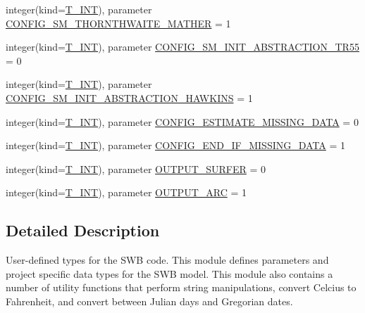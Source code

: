 \begin{DoxyCompactItemize}
\item 
integer(kind=\hyperlink{namespacetypes_a4e4d040a4425196c4d43be63e7e6103a}{T\_\-INT}), parameter \hyperlink{namespacetypes_ab0238e5ae5af01cbed3d4744b054f4b7}{CONFIG\_\-SM\_\-THORNTHWAITE\_\-MATHER} = 1
\item 
integer(kind=\hyperlink{namespacetypes_a4e4d040a4425196c4d43be63e7e6103a}{T\_\-INT}), parameter \hyperlink{namespacetypes_a479612698829962978355c82816e1875}{CONFIG\_\-SM\_\-INIT\_\-ABSTRACTION\_\-TR55} = 0
\item 
integer(kind=\hyperlink{namespacetypes_a4e4d040a4425196c4d43be63e7e6103a}{T\_\-INT}), parameter \hyperlink{namespacetypes_a580e1bc2da4e4c9c9881e31d2ee11478}{CONFIG\_\-SM\_\-INIT\_\-ABSTRACTION\_\-HAWKINS} = 1
\item 
integer(kind=\hyperlink{namespacetypes_a4e4d040a4425196c4d43be63e7e6103a}{T\_\-INT}), parameter \hyperlink{namespacetypes_a160cf0789c7288f51ba40cb7e19f46a3}{CONFIG\_\-ESTIMATE\_\-MISSING\_\-DATA} = 0
\item 
integer(kind=\hyperlink{namespacetypes_a4e4d040a4425196c4d43be63e7e6103a}{T\_\-INT}), parameter \hyperlink{namespacetypes_a9c39021370e43388bffb3def7c09570b}{CONFIG\_\-END\_\-IF\_\-MISSING\_\-DATA} = 1
\item 
integer(kind=\hyperlink{namespacetypes_a4e4d040a4425196c4d43be63e7e6103a}{T\_\-INT}), parameter \hyperlink{namespacetypes_a6a4c289d08a585bfc0dda1fa41bf2b4a}{OUTPUT\_\-SURFER} = 0
\item 
integer(kind=\hyperlink{namespacetypes_a4e4d040a4425196c4d43be63e7e6103a}{T\_\-INT}), parameter \hyperlink{namespacetypes_ad0c670d8c4ea7e20e1ae2bcdbb37ba24}{OUTPUT\_\-ARC} = 1
\end{DoxyCompactItemize}


\subsection{Detailed Description}
User-\/defined types for the SWB code. This module defines parameters and project specific data types for the SWB model. This module also contains a number of utility functions that perform string manipulations, convert Celcius to Fahrenheit, and convert between Julian days and Gregorian dates. 

